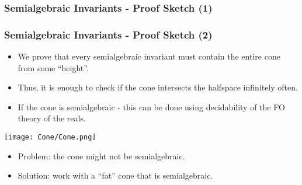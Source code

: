 \begin{frame}
\frametitle{Semialgebraic Invariants - Proof Sketch (1)}



\end{frame}

\begin{frame}
\frametitle{Semialgebraic Invariants - Proof Sketch (2)}
\begin{itemize}[<+->]
\item We prove that every semialgebraic invariant must contain the entire cone from some ``height''.
\item Thus, it is enough to check if the cone intersects the halfspace infinitely often.
\item If the cone is semialgebraic - this can be done using decidability of the FO theory of the reals.
\end{itemize}
\texttt{[image: Cone/Cone.png]}
\begin{itemize}[<+->]
\item Problem: the cone might not be semialgebraic.
\item Solution: work with a ``fat'' cone that is semialgebraic.
\end{itemize}
\end{frame}